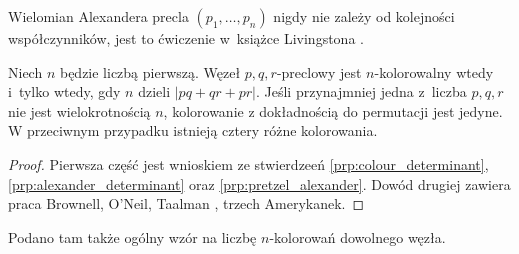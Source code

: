 Wielomian Alexandera precla $(p_1, \ldots, p_n)$ nigdy nie zależy od kolejności współczynników, jest to ćwiczenie w~książce Livingstona \cite[s. 215]{livingston93}.

\begin{proposition}
%
    Niech $n$ będzie liczbą pierwszą.
    Węzeł $p, q, r$-preclowy jest $n$-kolorowalny wtedy i~tylko wtedy, gdy $n$ dzieli $|pq+qr+pr|$.
    Jeśli przynajmniej jedna z~liczba $p, q, r$ nie jest wielokrotnością $n$, kolorowanie z dokładnością do permutacji jest jedyne.
    W przeciwnym przypadku istnieją cztery różne kolorowania.
\end{proposition}

\begin{proof}
%
%
%
    Pierwsza część jest wnioskiem ze stwierdzeeń \ref{prp:colour_determinant}, \ref{prp:alexander_determinant} oraz \ref{prp:pretzel_alexander}.
    Dowód drugiej zawiera praca Brownell, O'Neil, Taalman \cite{taalman05}, trzech Amerykanek.
\end{proof}

Podano tam także ogólny wzór na liczbę $n$-kolorowań dowolnego węzła.

%


